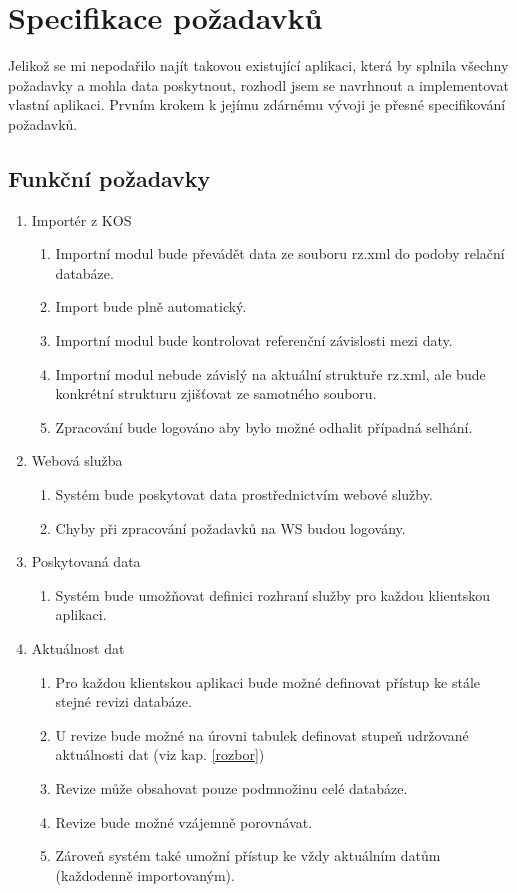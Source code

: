 \documentclass[11pt,twoside,a4paper]{book}
\begin{document}
\section{Specifikace požadavků}
Jelikož se mi nepodařilo najít takovou existující aplikaci, která by splnila všechny požadavky a mohla data poskytnout, rozhodl jsem se navrhnout a implementovat vlastní aplikaci. Prvním krokem k jejímu zdárnému vývoji je přesné specifikování požadavků.
\subsection{Funkční požadavky}

\begin{enumerate}
\item Importér z KOS
\begin{enumerate}
\item Importní modul bude převádět data ze souboru rz.xml do podoby relační databáze.
\item Import bude plně automatický.
\item Importní modul bude kontrolovat referenční závislosti mezi daty.
\item Importní modul nebude závislý na aktuální struktuře rz.xml, ale bude konkrétní strukturu zjišťovat ze samotného souboru.
\item Zpracování bude logováno aby bylo možné odhalit případná selhání.
\end{enumerate}

\item Webová služba
\begin{enumerate}
\item Systém bude poskytovat data prostřednictvím webové služby.
\item Chyby při zpracování požadavků na WS budou logovány.
\end{enumerate}

\item Poskytovaná data
\begin{enumerate}
\item Systém bude umožňovat definici rozhraní služby pro každou klientskou aplikaci.
\end{enumerate}

\item Aktuálnost dat
\begin{enumerate}
\item Pro každou klientskou aplikaci bude možné definovat přístup ke stále stejné revizi databáze.
\item U revize bude možné na úrovni tabulek definovat stupeň udržované aktuálnosti dat (viz kap. \ref{rozbor})
\item Revize může obsahovat pouze podmnožinu celé databáze.
\item Revize bude možné vzájemně porovnávat.
\item Zároveň systém také umožní přístup ke vždy aktuálním datům (každodenně importovaným).
\end{enumerate}
\end{enumerate}
\end{document}
